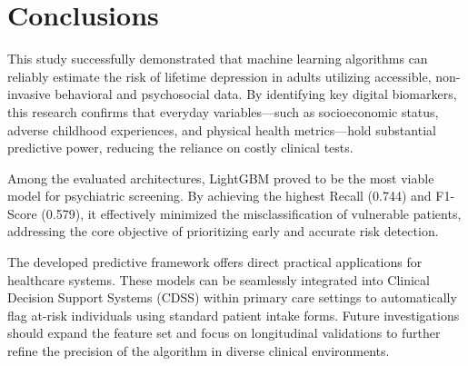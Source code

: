 \documentclass[conference]{IEEEtran}
\begin{document}
\section{Conclusions}

This study successfully demonstrated that machine learning algorithms can reliably estimate the risk of lifetime depression in adults utilizing accessible, non-invasive behavioral and psychosocial data. By identifying key digital biomarkers, this research confirms that everyday variables—such as socioeconomic status, adverse childhood experiences, and physical health metrics—hold substantial predictive power, reducing the reliance on costly clinical tests.

Among the evaluated architectures, LightGBM proved to be the most viable model for psychiatric screening. By achieving the highest Recall (0.744) and F1-Score (0.579), it effectively minimized the misclassification of vulnerable patients, addressing the core objective of prioritizing early and accurate risk detection. 

The developed predictive framework offers direct practical applications for healthcare systems. These models can be seamlessly integrated into Clinical Decision Support Systems (CDSS) within primary care settings to automatically flag at-risk individuals using standard patient intake forms. Future investigations should expand the feature set and focus on longitudinal validations to further refine the precision of the algorithm in diverse clinical environments.
 
 

\vspace{12pt}
\end{document}
